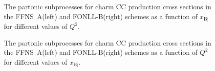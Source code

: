 \documentclass[pdftex,twocolumn,epjc3]{svjour3}          %
\newcommand{\xbj}{\ensuremath{x_{\text{Bj}}}\xspace}
\newcommand{\fonll} {{FONLL-B}\xspace}
\newcommand{\ffns} {{FFNS~A}\xspace}
\begin{document}
\begin{figure}
  \centering
  \caption{The partonic subprocesses for charm CC production cross
    sections in the \ffns (left) and \fonll (right) schemes as a
    function of \xbj for different values of $Q^2$.}
  \label{fig:partonic-x}
\end{figure}

\begin{figure}
  \centering
  \caption{The partonic subprocesses for charm CC production cross
    sections in the \ffns (left) and \fonll (right) schemes as a
    function of $Q^2$ for different values of \xbj.}
  \label{fig:partonic-q2}
\end{figure}
\end{document}
